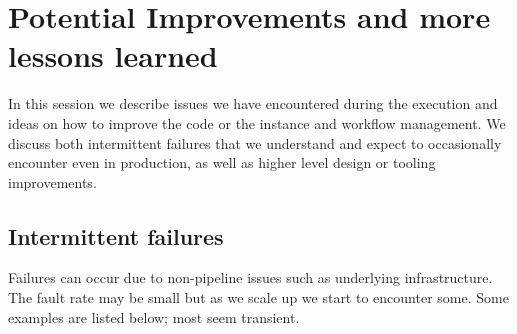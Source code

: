 \section{Potential Improvements and more lessons learned} \label{sec:future}

In this session we describe issues we have encountered during the execution and ideas on how to improve the code or the instance and workflow management.
We discuss both intermittent failures that we understand and expect to occasionally encounter even in production, as well as higher level design or tooling improvements.

\subsection{Intermittent failures}

Failures can occur due to non-pipeline issues such as underlying infrastructure.
The fault rate may be small but as we scale up we start to encounter some.
Some examples are listed below; most seem transient.



